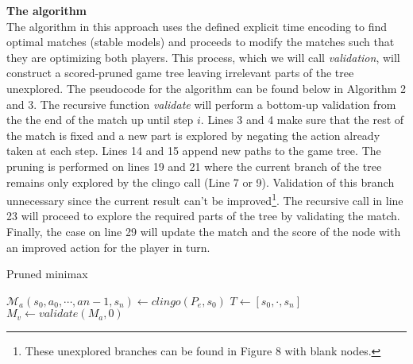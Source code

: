 \vspace{10px}
\textbf{The algorithm}\\

The algorithm in this approach uses the defined explicit time encoding to find optimal matches (stable models) and proceeds to modify the matches such that they are optimizing both players. This process, which we will call \textit{validation}, will construct a scored-pruned game tree leaving irrelevant parts of the tree unexplored. The pseudocode for the algorithm can be found below in Algorithm 2 and 3. The recursive function \textit{validate} will perform a bottom-up validation from the the end of the match up until step $i$. Lines 3 and 4 make sure that the rest of the match is fixed and a new part is explored by negating the action already taken at each step. Lines 14 and 15 append new paths to the game tree. The pruning is performed on lines 19 and 21 where the current branch of the tree remains only explored by the clingo call (Line 7 or 9). Validation of this branch unnecessary since the current result can't be improved\footnote{These unexplored branches can be found in Figure 8 with blank nodes.}. The recursive call in line 23 will proceed to explore the required parts of the tree by validating the match. Finally, the case on line 29 will update the match and the score of the node with an improved action for the player in turn. 


\begin{algorithm}
  \caption{Pruned minimax}
  \begin{algorithmic}[1]
  \Statex
      \State $\mathcal{M}_a(s_0,a_0,\cdots,a{n-1}, s_n) \gets clingo(P_e,s_0)$ 
      \State $T \gets [s_0,\cdot,s_n]$ 
      \State $M_v \gets validate(M_a,0)$
    \EndFunction
  \end{algorithmic}
\end{algorithm}

